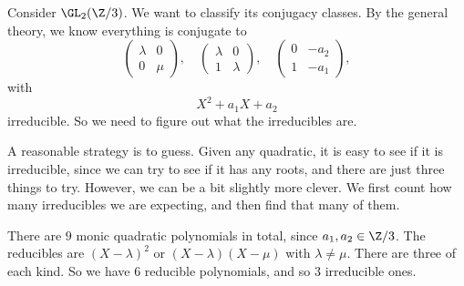\documentclass[a4paper]{article}
\begin{document}
\begin{eg}
  Consider $\GL_2(\Z/3)$. We want to classify its conjugacy classes. By the general theory, we know everything is conjugate to
  \[
    \begin{pmatrix}
      \lambda & 0\\
      0 & \mu
    \end{pmatrix},\quad
    \begin{pmatrix}
      \lambda & 0\\
      1 & \lambda
    \end{pmatrix},\quad
    \begin{pmatrix}
      0 & -a_2\\
      1 & -a_1
    \end{pmatrix},
  \]
  with
  \[
    X^2 + a_1 X + a_2
  \]
  irreducible. So we need to figure out what the irreducibles are.

  A reasonable strategy is to guess. Given any quadratic, it is easy to see if it is irreducible, since we can try to see if it has any roots, and there are just three things to try. However, we can be a bit slightly more clever. We first count how many irreducibles we are expecting, and then find that many of them.

  There are $9$ monic quadratic polynomials in total, since $a_1, a_2 \in \Z/3$. The reducibles are $(X - \lambda)^2$ or $(X - \lambda)(X - \mu)$ with $\lambda \not= \mu$. There are three of each kind. So we have $6$ reducible polynomials, and so $3$ irreducible ones.


\end{eg}
\end{document}
